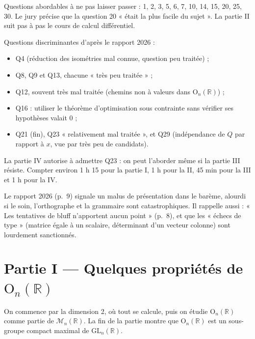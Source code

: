 \documentclass[11pt,a4paper]{article}
\providecommand{\tightlist}{\setlength{\itemsep}{0pt}\setlength{\parskip}{0pt}}
\begin{document}
Questions abordables à ne pas laisser passer : 1, 2, 3, 5, 6, 7, 10, 14, 15, 20, 25, 30. Le jury précise que la question 20 « était la plus facile du sujet ». La partie II suit pas à pas le cours de calcul différentiel.

Questions discriminantes d'après le rapport 2026 :

\begin{itemize}
\tightlist
\item
  Q4 (réduction des isométries mal connue, question peu traitée) ;
\item
  Q8, Q9 et Q13, chacune « très peu traitée » ;
\item
  Q12, souvent très mal traitée (chemins non à valeurs dans \({\mathrm{O}}_n(\mathbb R)\)) ;
\item
  Q16 : utiliser le théorème d'optimisation sous contrainte sans vérifier ses hypothèses valait 0 ;
\item
  Q21 (fin), Q23 « relativement mal traitée », et Q29 (indépendance de \(Q\) par rapport à \(x\), vue par très peu de candidats).
\end{itemize}

La partie IV autorise à admettre Q23 : on peut l'aborder même si la partie III résiste. Compter environ 1 h 15 pour la partie I, 1 h pour la II, 45 min pour la III et 1 h pour la IV.

\begin{jury}

Le rapport 2026 (p.~9) signale un malus de présentation dans le barème, alourdi si le soin, l'orthographe et la grammaire sont catastrophiques. Il rappelle aussi : « Les tentatives de bluff n'apportent aucun point » (p.~8), et que les « échecs de type » (matrice égale à un scalaire, déterminant d'un vecteur colonne) sont lourdement sanctionnés.

\end{jury}

\hypertarget{partie-i-quelques-propriuxe9tuxe9s-de-mathrmo_nmathbb-r}{%
\section{\texorpdfstring{Partie I --- Quelques propriétés de \({\mathrm{O}}_n(\mathbb R)\)}{Partie I --- Quelques propriétés de \{\textbackslash mathrm\{O\}\}\_n(\textbackslash mathbb R)}}\label{partie-i-quelques-propriuxe9tuxe9s-de-mathrmo_nmathbb-r}}

On commence par la dimension 2, où tout se calcule, puis on étudie \({\mathrm{O}}_n(\mathbb R)\) comme partie de \(\mathcal M_n(\mathbb R)\). La fin de la partie montre que \({\mathrm{O}}_n(\mathbb R)\) est un sous-groupe compact maximal de \({\mathrm{GL}}_n(\mathbb R)\).
\end{document}
